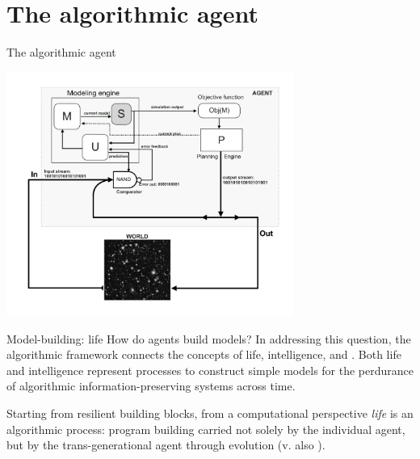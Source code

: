 \section{The algorithmic agent}


\begin{frame}[label=ladila]{The algorithmic agent}
 \begin{center}
  \includegraphics[height=8cm]{img/agent.png}
  \end{center}
  
 
\end{frame}


\begin{frame}[label=ladila]{Model-building: life}
 How do agents build models? In addressing this question, the algorithmic framework connects the concepts of life, intelligence, and \SEP. Both life and intelligence represent processes to construct simple models for the perdurance of algorithmic information-preserving systems across time. \vfill
 
  Starting from resilient building blocks, from a computational perspective {\em life} is an algorithmic process: program building carried not solely by the individual agent, but by the trans-generational agent through evolution (v. also \cite{Walker2013, Chaitin2012-wd}).
  
\end{frame}

